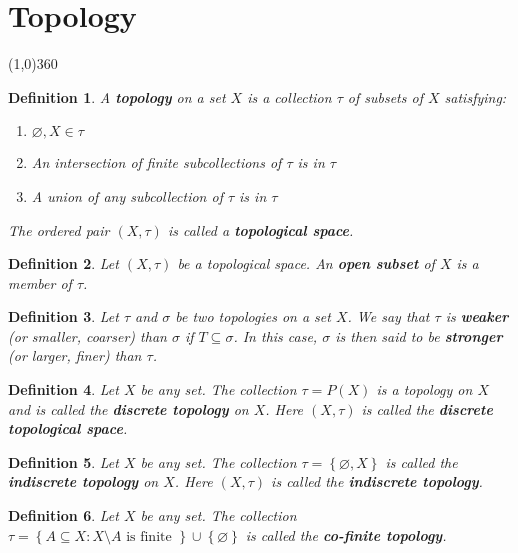 \documentclass[14pt,twoside]{extreport}
\theoremstyle{dotless}
\newtheorem*{defn}{Definition}
\begin{document}
\newpage
{}

\chapter*{Topology}
\line(1,0){360}

\begin{defn}
A \textbf{topology} on a set $X$ is a collection $\tau$ of subsets of $X$ satisfying:
    \begin{enumerate}
        \item $\varnothing, X \in  \tau$
        \item  An intersection of finite subcollections of $\tau$ is in $\tau$
        \item A union of any subcollection of $\tau$ is in $\tau$
    \end{enumerate}
The ordered pair $\left (X, \tau\right )$ is called a \textbf{topological space}.
\end{defn}


\begin{defn}
    Let $\left (X, \tau\right )$ be a topological space. An \textbf{open subset} of $X$ is a member of $\tau$.
\end{defn}

\begin{defn}
Let $\tau$ and $\sigma$ be two topologies on a set $X$. We say that $\tau$ is \textbf{weaker} (or smaller, coarser) than $\sigma$ if $T \subseteq \sigma$. In this case, $\sigma$ is then said to be \textbf{stronger} (or larger, finer) than $\tau$.
\end{defn}

\begin{defn}
Let $X$ be any set. The collection $\tau = P\left (X\right )$ is a topology on $X$ and is called the \textbf{discrete topology} on $X$. Here $\left (X, \tau\right )$ is called the \textbf{discrete topological space}.
\end{defn}

\begin{defn}
Let $X$ be any set. The collection $\tau = \left\{ \varnothing, X \right\}$ is called the \textbf{indiscrete topology} on $X$. Here $\left (X, \tau\right )$ is called the \textbf{indiscrete topology}.
\end{defn}

\begin{defn}
    Let $X$ be any set. The collection $\tau = \left\{ A \subseteq X  :  X \setminus A \text{ is finite } \right\} \cup \left\{ \varnothing \right\}$ is called the \textbf{co-finite topology}.
\end{defn}
\end{document}
